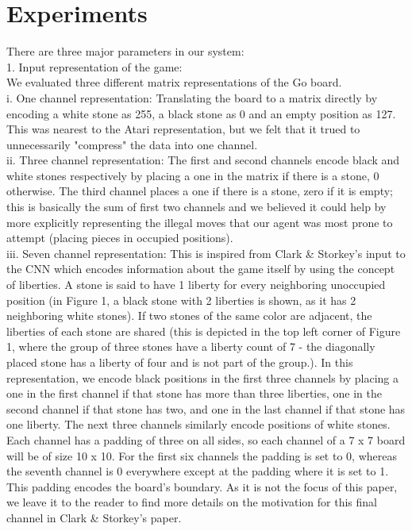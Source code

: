 \section{Experiments}
There are three major parameters in our system:
\\
1. Input representation of the game:
\\
We evaluated three different matrix representations of the Go board.
\\
i. One channel representation: Translating the board to a matrix directly by encoding a white stone as 255, a black stone as 0 and an empty position as 127. This was nearest to the Atari representation, but we felt that it trued to unnecessarily "compress" the data into one channel.
\\ii. Three channel representation: The first and second channels encode black and white stones respectively by placing a one in the matrix if there is a stone, 0 otherwise. The third channel places a one if there is a stone, zero if it is empty; this is basically the sum of first two channels and we believed it could help by more explicitly representing the illegal moves that our agent was most prone to attempt (placing pieces in occupied positions).
\\
iii. Seven channel representation: This is inspired from Clark \& Storkey's input to the CNN which encodes information about the game itself by using the concept of liberties. A stone is said to have 1 liberty for every neighboring unoccupied position (in Figure 1, a black stone with 2 liberties is shown, as it has 2 neighboring white stones). If two stones of the same color are adjacent, the liberties of each stone are shared (this is depicted in the top left corner of Figure 1, where the group of three stones have a liberty count of 7 - the diagonally placed stone has a liberty of four and is not part of the group.). In this representation, we encode black positions in the first three channels by placing a one in the first channel if that stone has more than three liberties, one in the second channel if that stone has two, and one in the last channel if that stone has one liberty. The next three channels similarly encode positions of white stones. Each channel has a padding of three on all sides, so each channel of a 7 x 7 board will be of size 10 x 10. For the first six channels the padding is set to 0, whereas the seventh channel is 0 everywhere except at the padding where it is set to 1. This padding encodes the board's boundary. As it is not the focus of this paper, we leave it to the reader to find more details on the motivation for this final channel in Clark \& Storkey's paper.
